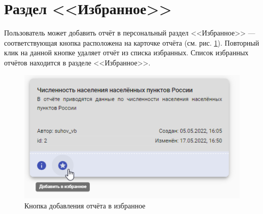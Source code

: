 \documentclass[../user-manual.tex]{subfiles}
\begin{document}
	\section{Раздел <<Избранное>>}
	
	Пользователь может добавить отчёт в персональный раздел <<Избранное>> --- соответствующая кнопка расположена на карточке отчёта (см. рис. \ref{fig:add-to-favorites}). Повторный клик на данной кнопке удаляет отчёт из списка избранных. Список избранных отчётов находится в разделе <<Избранное>>.
	
	\begin{figure}[h]
		\centering
		\includegraphics[width=\graphicswidth]{img/5-add-to-favorites.png}
		\caption{Кнопка добавления отчёта в избранное}
		\label{fig:add-to-favorites}
	\end{figure}	
	
\end{document}
